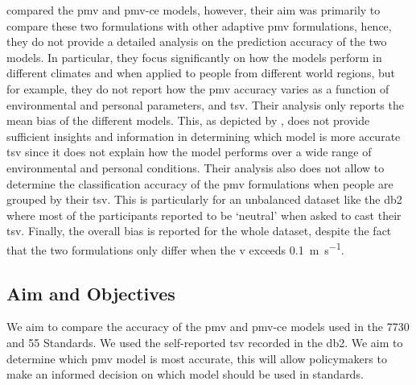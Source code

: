  compared the \ac{pmv} and \ac{pmv-ce} models, however, their aim was primarily to compare these two formulations with other adaptive \ac{pmv} formulations, hence, they do not provide a detailed analysis on the prediction accuracy of the two models.
In particular, they focus significantly on how the models perform in different climates and when applied to people from different world regions, but for example, they do not report how the \ac{pmv} accuracy varies as a function of environmental and personal parameters, and \ac{tsv}.
Their analysis only reports the mean bias of the different models.
This, as depicted by , does not provide sufficient insights and information in determining which model is more accurate \ac{tsv} since it does not explain how the model performs over a wide range of environmental and personal conditions.
Their analysis also does not allow to determine the classification accuracy of the \ac{pmv} formulations when people are grouped by their \ac{tsv}.
This is particularly for an unbalanced dataset like the \ac{db2} where most of the participants reported to be `neutral' when asked to cast their \ac{tsv}.
Finally, the overall bias is reported for the whole dataset, despite the fact that the two formulations only differ when the \ac{v} exceeds \qty{0.1}{\m\per\s}.

\subsection{Aim and Objectives}\label{subsec:aim-and-objectives}
We aim to compare the accuracy of the \ac{pmv} and \ac{pmv-ce} models used in the \gls{7730} and \gls{55} Standards.
We used the self-reported \ac{tsv} recorded in the \ac{db2}.
We aim to determine which \ac{pmv} model is most accurate, this will allow policymakers to make an informed decision on which model should be used in standards.